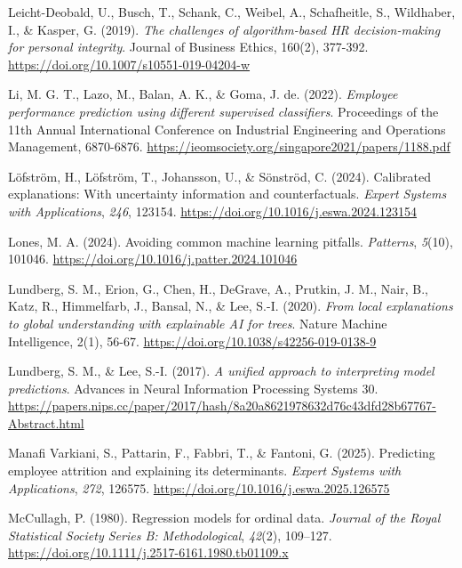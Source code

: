 \documentclass[
  a4paper,
  review]{elsarticle}
\newlength{\cslhangindent}
\newenvironment{CSLReferences}[2] %
 {\begin{list}{}{%
  \setlength{\itemindent}{0pt}
  \setlength{\leftmargin}{0pt}
  \setlength{\parsep}{0pt}
  \ifodd #1
   \setlength{\leftmargin}{\cslhangindent}
   \setlength{\itemindent}{-1\cslhangindent}
  \fi
  \setlength{\itemsep}{#2\baselineskip}}}
 {\end{list}}
\begin{document}
\begin{CSLReferences}{1}{0}
Leicht-Deobald, U., Busch, T., Schank, C., Weibel, A., Schafheitle, S.,
Wildhaber, I., \& Kasper, G. (2019). \emph{The challenges of
algorithm-based HR decision-making for personal integrity}. Journal of
Business Ethics, 160(2), 377-392.
\url{https://doi.org/10.1007/s10551-019-04204-w}

Li, M. G. T., Lazo, M., Balan, A. K., \& Goma, J. de. (2022).
\emph{Employee performance prediction using different supervised
classifiers}. Proceedings of the 11th Annual International Conference on
Industrial Engineering and Operations Management, 6870-6876.
\url{https://ieomsociety.org/singapore2021/papers/1188.pdf}

Löfström, H., Löfström, T., Johansson, U., \& Sönströd, C. (2024).
Calibrated explanations: With uncertainty information and
counterfactuals. \emph{Expert Systems with Applications}, \emph{246},
123154. \url{https://doi.org/10.1016/j.eswa.2024.123154}

Lones, M. A. (2024). Avoiding common machine learning pitfalls.
\emph{Patterns}, \emph{5}(10), 101046.
\url{https://doi.org/10.1016/j.patter.2024.101046}

Lundberg, S. M., Erion, G., Chen, H., DeGrave, A., Prutkin, J. M., Nair,
B., Katz, R., Himmelfarb, J., Bansal, N., \& Lee, S.-I. (2020).
\emph{From local explanations to global understanding with explainable
AI for trees}. Nature Machine Intelligence, 2(1), 56-67.
\url{https://doi.org/10.1038/s42256-019-0138-9}

Lundberg, S. M., \& Lee, S.-I. (2017). \emph{A unified approach to
interpreting model predictions}. Advances in Neural Information
Processing Systems 30.
\url{https://papers.nips.cc/paper/2017/hash/8a20a8621978632d76c43dfd28b67767-Abstract.html}

Manafi Varkiani, S., Pattarin, F., Fabbri, T., \& Fantoni, G. (2025).
Predicting employee attrition and explaining its determinants.
\emph{Expert Systems with Applications}, \emph{272}, 126575.
\url{https://doi.org/10.1016/j.eswa.2025.126575}

McCullagh, P. (1980). Regression models for ordinal data. \emph{Journal
of the Royal Statistical Society Series B: Methodological},
\emph{42}(2), 109--127.
\url{https://doi.org/10.1111/j.2517-6161.1980.tb01109.x}


\end{CSLReferences}
\end{document}
